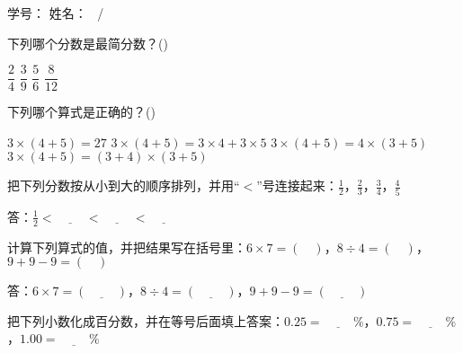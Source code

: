 \documentclass{ksexam}
\begin{document}
{学号：\underline{\hspace*{8em}}}
{姓名：\underline{\hspace*{8em}}}
{\thepage{}\ /\ \numpages{}}


\begin{questions}


    \question[10] 下列哪个分数是最简分数？(\hspace*{2em})

    \begin{oneparchoices}
        \choice $\dfrac{2}{4}$
        \choice $\dfrac{3}{9}$
        \CorrectChoice $\dfrac{5}{6}$
        \choice $\dfrac{8}{12}$
    \end{oneparchoices}

    \question[10] 下列哪个算式是正确的？(\hspace*{2em})

    \begin{choices}
        \choice $3 \times (4 + 5) = 27$
        \CorrectChoice $3 \times (4 + 5) = 3 \times 4 + 3 \times 5$
        \choice $3 \times (4 + 5) = 4 \times (3 + 5)$
        \choice $3 \times (4 + 5) = (3 + 4) \times (3 + 5)$
    \end{choices}


    \question[8] 把下列分数按从小到大的顺序排列，并用“$<$”号连接起来：$\frac{1}{2}$，$\frac{2}{3}$，$\frac{3}{4}$，$\frac{4}{5}$

    答：$\frac{1}{2} < \underline{\hspace{1cm}} < \underline{\hspace{1cm}} < \underline{\hspace{1cm}}$

    \question[8] 计算下列算式的值，并把结果写在括号里：$6 \times 7 = (\quad)$，$8 \div 4 = (\quad)$，$9 + 9 - 9 = (\quad)$

    答：$6 \times 7 = (\underline{\hspace{1cm}})$，$8 \div 4 = (\underline{\hspace{1cm}})$，$9 + 9 - 9 = (\underline{\hspace{1cm}})$

    \question[8] 把下列小数化成百分数，并在等号后面填上答案：$0.25 = \underline{\hspace{1cm}} \%$，$0.75 = \underline{\hspace{1cm}} \%$，$1.00 = \underline{\hspace{1cm}} \%$


\end{questions}
\end{document}
